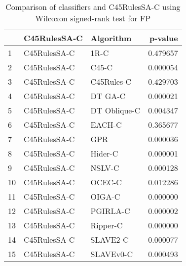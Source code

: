 \begin{table}
\footnotesize
\caption{Comparison of classifiers and C45RulesSA-C using Wilcoxon signed-rank test for FP}
\label{tab:C45RulesSA-C wilcoxon FP comparison}
\begin{tabular}{lllr}
\hline
 & C45RulesSA-C & Algorithm & p-value \\
\hline
1 & C45RulesSA-C & 1R-C & 0.479657 \\
2 & C45RulesSA-C & C45-C & 0.000054 \\
3 & C45RulesSA-C & C45Rules-C & 0.429703 \\
4 & C45RulesSA-C & DT GA-C & 0.000021 \\
5 & C45RulesSA-C & DT Oblique-C & 0.004347 \\
6 & C45RulesSA-C & EACH-C & 0.365677 \\
7 & C45RulesSA-C & GPR & 0.000036 \\
8 & C45RulesSA-C & Hider-C & 0.000001 \\
9 & C45RulesSA-C & NSLV-C & 0.000128 \\
10 & C45RulesSA-C & OCEC-C & 0.012286 \\
11 & C45RulesSA-C & OIGA-C & 0.000000 \\
12 & C45RulesSA-C & PGIRLA-C & 0.000002 \\
13 & C45RulesSA-C & Ripper-C & 0.000000 \\
14 & C45RulesSA-C & SLAVE2-C & 0.000077 \\
15 & C45RulesSA-C & SLAVEv0-C & 0.000493 \\
\hline
\end{tabular}
\end{table}
